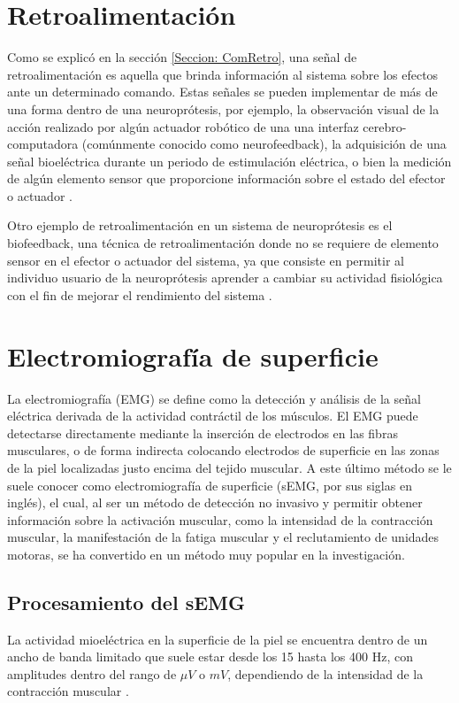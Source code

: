 \section{Retroalimentación}\label{Seccion: Retro}
Como se explicó en la sección \ref{Seccion: ComRetro}, una señal de retroalimentación es aquella que brinda información al sistema sobre los efectos ante un determinado comando. Estas señales se pueden implementar de más de una forma dentro de una neuroprótesis, por ejemplo, la observación visual de la acción realizado por algún actuador robótico de una una interfaz cerebro-computadora (comúnmente conocido como neurofeedback), la adquisición de una señal bioeléctrica durante un periodo de estimulación eléctrica, o bien la medición de algún elemento sensor que proporcione información sobre el estado del efector o actuador \cite{Wright2016}.

Otro ejemplo de retroalimentación en un sistema de neuroprótesis es el biofeedback, una técnica de retroalimentación donde no se requiere de elemento sensor en el efector o actuador del sistema, ya que consiste en permitir al individuo usuario de la neuroprótesis aprender a cambiar su actividad fisiológica con el fin de mejorar el rendimiento del sistema \cite{Yucha2008}.

\section{Electromiografía de superficie}
La electromiografía (EMG) se define como la detección y análisis de la señal eléctrica derivada de la actividad contráctil de los músculos. El EMG puede detectarse directamente mediante la inserción de electrodos en las fibras musculares, o de forma indirecta colocando electrodos de superficie en las zonas de la piel localizadas justo encima del tejido muscular. A este último método se le suele conocer como electromiografía de superficie (sEMG, por sus siglas en inglés), el cual, al ser un método de detección no invasivo y permitir obtener información sobre la activación muscular, como la intensidad de la contracción muscular, la manifestación de la fatiga muscular y el reclutamiento de unidades motoras, se ha convertido en un método muy popular en la investigación.

\subsection{Procesamiento del sEMG}
La actividad mioeléctrica en la superficie de la piel se encuentra dentro de un ancho de banda limitado que suele estar desde los 15 hasta los 400 Hz, con amplitudes dentro del rango de $\mu V$ o $mV$, dependiendo de la intensidad de la contracción muscular \cite{Cavalcanti-Garcia2009}.


